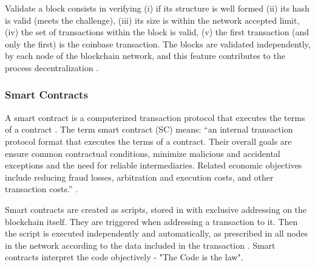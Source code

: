 Validate a block consists in verifying (i) if its structure is well formed (ii) its hash is valid (meets the challenge), (iii) its size is within the network accepted limit, (iv) the set of transactions within the block is valid, (v) the first transaction (and only the first) is the coinbase transaction. The blocks are validated independently, by each node of the blockchain network, and this feature contributes to the process decentralization \cite{greve2018blockchain}.

\subsubsection{Smart Contracts}\label{sec:smartContracts}
A smart contract is a computerized transaction protocol that executes the terms of a contract \cite{szabo1997idea}. The term smart contract (SC) means: “an internal transaction protocol format that executes the terms of a contract. Their overall goals are ensure common contractual conditions, minimize malicious and accidental exceptions and the need for reliable intermediaries. Related economic objectives include reducing fraud losses, arbitration and execution costs, and other transaction costs.” \cite{szabo1997idea}.

Smart contracts are created as scripts, stored in with exclusive addressing on the blockchain itself. They are triggered when addressing a transaction to it. Then the script is executed independently and automatically, as prescribed in all nodes in the network according to the data included in the transaction \cite{greve2018blockchain}. Smart contracts interpret the code objectively - "The Code is the law".

